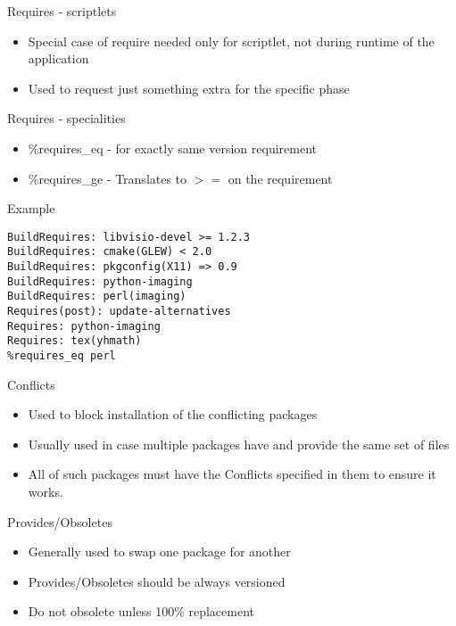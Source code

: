 \documentclass{beamer}
\begin{document}
\begin{frame}[t]{Requires - scriptlets}
	\begin{itemize}
	\item Special case of require needed only for scriptlet, not during runtime of the application
    \item Used to request just something extra for the specific phase
	\end{itemize}
\end{frame}

\begin{frame}[t]{Requires - specialities}
	\begin{itemize}
    \item \%requires\_eq - for exactly same version requirement
    \item  \%requires\_ge - Translates to $>=$ on the requirement
	\end{itemize}
\end{frame}

\begin{frame}[fragile]{Example}
	\begin{small}
	\begin{verbatim}
BuildRequires: libvisio-devel >= 1.2.3
BuildRequires: cmake(GLEW) < 2.0
BuildRequires: pkgconfig(X11) => 0.9
BuildRequires: python-imaging
BuildRequires: perl(imaging)
Requires(post): update-alternatives
Requires: python-imaging
Requires: tex(yhmath)
%requires_eq perl
	\end{verbatim}
	\end{small}
\end{frame}

\begin{frame}[t]{Conflicts}
	\begin{itemize}
    \item Used to block installation of the conflicting packages
    \item Usually used in case multiple packages have and provide the same set of files
    \item All of such packages must have the Conflicts specified in them to ensure it works.
	\end{itemize}
\end{frame}

\begin{frame}[t]{Provides/Obsoletes}
	\begin{itemize}
	\item Generally used to swap one package for another
    \item Provides/Obsoletes should be always versioned
    \item Do not obsolete unless 100\% replacement
	\end{itemize}
\end{frame}
\end{document}
